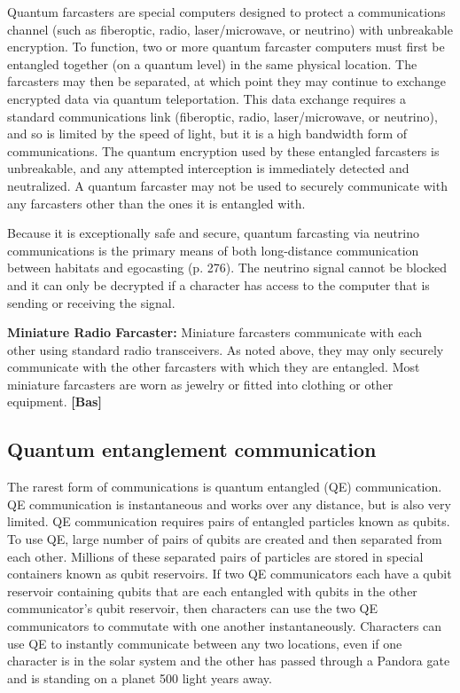 {{Quantum farcasters are special computers designed to protect a communications channel (such as fiberoptic, radio, laser/microwave, or neutrino) with unbreakable encryption. To function, two or more quantum farcaster computers must first be entangled together (on a quantum level) in the same physical location. The farcasters may then be separated, at which point they may continue to exchange encrypted data via quantum teleportation. This data exchange requires a standard communications link (fiberoptic, radio, laser/microwave, or neutrino), and so is limited by the speed of light, but it is a high bandwidth form of communications. The quantum encryption used by these entangled farcasters is unbreakable, and any attempted interception is immediately detected and neutralized. A quantum farcaster may not be used to securely communicate with any farcasters other than the ones it is entangled with. 

Because it is exceptionally safe and secure, quantum farcasting via neutrino communications is the primary means of both long-distance communication between habitats and egocasting (p. 276). The neutrino signal cannot be blocked and it can only be decrypted if a character has access to the computer that is sending or receiving the signal. 

\textbf{Miniature Radio Farcaster:} Miniature farcasters communicate with each other using standard radio transceivers. As noted above, they may only securely communicate with the other farcasters with which they are entangled. Most miniature farcasters are worn as jewelry or fitted into clothing or other equipment. \textbf{[Bas]} 



\subsection{Quantum entanglement communication} \label{sec:quantum-entanglement-communication} 

The rarest form of communications is quantum entangled (QE) communication. QE communication is instantaneous and works over any distance, but is also very limited. QE communication requires pairs of entangled particles known as qubits. To use QE, large number of pairs of qubits are created and then separated from each other. Millions of these separated pairs of particles are stored in special containers known as qubit reservoirs. If two QE communicators each have a qubit reservoir containing qubits that are each entangled with qubits in the other communicator’s qubit reservoir, then characters can use the two QE communicators to commutate with one another instantaneously. Characters can use QE to instantly communicate between any two locations, even if one character is in the solar system and the other has passed through a Pandora gate and is standing on a planet 500 light years away. 

}}
